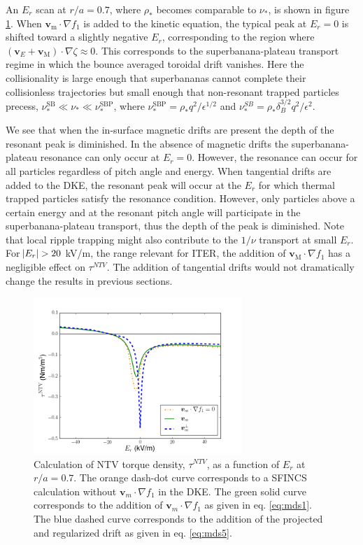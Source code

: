 \documentclass[aip, pop, preprint]{revtex4-1}
\numberwithin{figure}{section}
\numberwithin{equation}{section}
\begin{document}
An $E_r$ scan at $r/a = 0.7$, where $\rho_*$ becomes comparable to $\nu_*$, is shown in figure \ref{fig:driftschemes}. When $\bm{v}_{\text{m}} \cdot \nabla f_1$ is added to the kinetic equation, the typical peak at $E_r = 0$ is shifted toward a slightly negative $E_r$, corresponding to the region where $(\bm{v}_E + \bm{v}_\text{M})\cdot \nabla \zeta \approx 0$. This corresponds to the superbanana-plateau transport regime in which the bounce averaged toroidal drift vanishes. Here the collisionality is large enough that superbananas cannot complete their collisionless trajectories but small enough that non-resonant trapped particles precess, $\nu_*^{\text{SB}} \ll \nu_* \ll \nu_*^{\text{SBP}}$, where $\nu_*^{\text{SBP}} = \rho_*q^2/\epsilon^{1/2}$ and $\nu_*^{SB} = \rho_* \delta_B^{3/2} q^2/\epsilon^2$.\cite{Shaing2009_sb, Shaing2009_sbp} 

We see that when the in-surface magnetic drifts are present the depth of the resonant peak is diminished. In the absence of magnetic drifts the superbanana-plateau resonance can only occur at $E_r = 0$. However, the resonance can occur for all particles regardless of pitch angle and energy. When tangential drifts are added to the DKE, the resonant peak will occur at the $E_r$ for which thermal trapped particles satisfy the resonance condition. However, only particles above a certain energy and at the resonant pitch angle will participate in the superbanana-plateau transport, thus the depth of the peak is diminished. Note that local ripple trapping might also contribute to the $1/\nu$ transport at small $E_r$. For $\abs{E_r} > 20$ kV/m, the range relevant for ITER, the addition of $\bm{v}_{\text{M}}\cdot \nabla f_1$ has a negligible effect on $\tau^{NTV}$. The addition of tangential drifts would not dramatically change the results in previous sections.  

\begin{figure}[h!]
\centering
\includegraphics[width=0.7\textwidth]{mdscomparison.png}
\caption{\label{fig:driftschemes} Calculation of NTV torque density, $\tau^{NTV}$, as a function of $E_r$ at $r/a = 0.7$. The orange dash-dot curve corresponds to a SFINCS calculation without $\bm{v}_m \cdot \nabla f_1$ in the DKE. The green solid curve corresponds to the addition of $\bm{v}_m \cdot \nabla f_1$ as given in eq. \ref{eq:mds1}. The blue dashed curve corresponds to the addition of the projected and regularized drift as given in eq. \ref{eq:mds5}.}
\end{figure}
\end{document}
